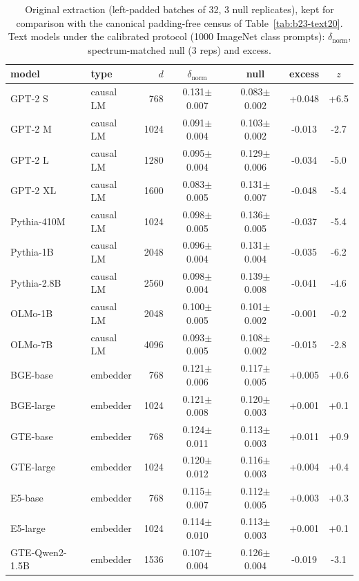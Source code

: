 \begin{table}[H]
\centering
\small
\begin{tabular}{llrcccc}
\toprule
model & type & $d$ & $\delta_{\text{norm}}$ & null & excess & $z$ \\
\midrule
GPT-2 S & causal LM & 768 & 0.131$\pm$0.007 & 0.083$\pm$0.002 & +0.048 & +6.5 \\
GPT-2 M & causal LM & 1024 & 0.091$\pm$0.004 & 0.103$\pm$0.002 & -0.013 & -2.7 \\
GPT-2 L & causal LM & 1280 & 0.095$\pm$0.004 & 0.129$\pm$0.006 & -0.034 & -5.0 \\
GPT-2 XL & causal LM & 1600 & 0.083$\pm$0.005 & 0.131$\pm$0.007 & -0.048 & -5.4 \\
Pythia-410M & causal LM & 1024 & 0.098$\pm$0.005 & 0.136$\pm$0.005 & -0.037 & -5.4 \\
Pythia-1B & causal LM & 2048 & 0.096$\pm$0.004 & 0.131$\pm$0.004 & -0.035 & -6.2 \\
Pythia-2.8B & causal LM & 2560 & 0.098$\pm$0.004 & 0.139$\pm$0.008 & -0.041 & -4.6 \\
OLMo-1B & causal LM & 2048 & 0.100$\pm$0.005 & 0.101$\pm$0.002 & -0.001 & -0.2 \\
OLMo-7B & causal LM & 4096 & 0.093$\pm$0.005 & 0.108$\pm$0.002 & -0.015 & -2.8 \\
BGE-base & embedder & 768 & 0.121$\pm$0.006 & 0.117$\pm$0.005 & +0.005 & +0.6 \\
BGE-large & embedder & 1024 & 0.121$\pm$0.008 & 0.120$\pm$0.003 & +0.001 & +0.1 \\
GTE-base & embedder & 768 & 0.124$\pm$0.011 & 0.113$\pm$0.003 & +0.011 & +0.9 \\
GTE-large & embedder & 1024 & 0.120$\pm$0.012 & 0.116$\pm$0.003 & +0.004 & +0.4 \\
E5-base & embedder & 768 & 0.115$\pm$0.007 & 0.112$\pm$0.005 & +0.003 & +0.3 \\
E5-large & embedder & 1024 & 0.114$\pm$0.010 & 0.113$\pm$0.003 & +0.001 & +0.1 \\
GTE-Qwen2-1.5B & embedder & 1536 & 0.107$\pm$0.004 & 0.126$\pm$0.004 & -0.019 & -3.1 \\
\bottomrule
\end{tabular}
\caption{Original extraction (left-padded batches of 32, 3 null replicates), kept for comparison with the canonical padding-free census of Table~\ref{tab:b23-text20}. Text models under the calibrated protocol (1000 ImageNet class prompts): $\delta_{\text{norm}}$, spectrum-matched null (3 reps) and excess.}
\label{tab:b1-textnulls}
\end{table}
